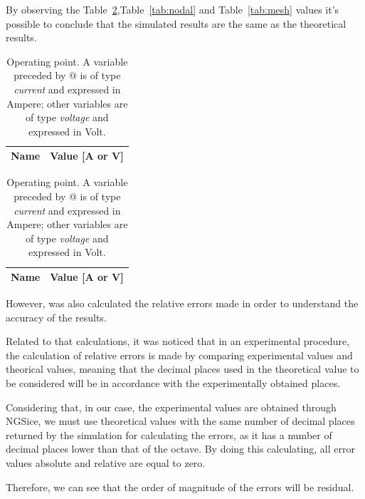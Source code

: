 By observing the Table~\ref{tab:op},Table~\ref{tab:nodal} and Table~\ref{tab:mesh} values it's possible to conclude that the simulated results are the same as the theoretical results.%

\begin{table}[h]
  \centering
  \begin{tabular}{|l|r|}
    \hline    
    {\bf Name} & {\bf Value [A or V]} \\ \hline
    
  \end{tabular}
  \caption{Operating point. A variable preceded by @ is of type {\em current}
    and expressed in Ampere; other variables are of type {\it voltage} and expressed in
    Volt.}
  \label{tab:op}
\end{table}

\begin{table}[h]
  \centering
  \begin{tabular}{|l|r|}
    \hline    
    {\bf Name} & {\bf Value [A or V]} \\ \hline
    
  \end{tabular}
  \caption{Operating point. A variable preceded by @ is of type {\em current}
    and expressed in Ampere; other variables are of type {\it voltage} and expressed in
    Volt.}
  \label{tab:op}
\end{table}

However, was also calculated the relative errors made in order to understand the accuracy of the results. 

Related to that calculations, it was noticed that in an experimental procedure, the calculation of relative errors is made by comparing experimental values and theorical values, meaning that the decimal places used in the theoretical value to be considered will be in accordance with the experimentally obtained places.


Considering that, in our case, the experimental values are obtained through NGSice, we must use theoretical values with the same number of decimal places returned by the simulation for calculating the errors, as it has a number of decimal places lower than that of the octave. By doing this calculating, all error values absolute and relative are equal to zero. 

Therefore, we can see that the order of magnitude of the errors will be residual.




